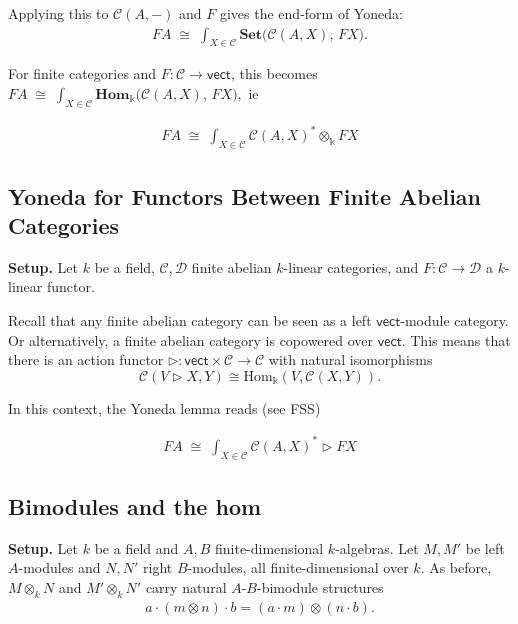 \documentclass[11pt]{article}
\newcommand{\C}{\mathcal{C}}
\theoremstyle{definition}
\begin{document}
Applying this to $\mathcal{C}(A,-)$ and $F$ gives the end-form of Yoneda:
\begin{align}
FA \;\cong\; \int_{X \in \mathcal{C}} \mathbf{Set}\big(\mathcal{C}(A,X),\, FX\big).
\end{align}


For finite categories and $F: \C \to \mathsf{vect}$, this becomes $FA \;\cong\; \int_{X \in \mathcal{C}} \mathbf{Hom}_\Bbbk \big(\mathcal{C}(A,X),\, FX\big), $ ie

\begin{align}
\boxed{
FA \;\cong\; \int_{X \in \mathcal{C}} \mathcal{C}(A,X)^* \otimes_\Bbbk FX
}
\end{align}





\subsection{Yoneda for Functors Between Finite Abelian Categories}

\textbf{Setup.} Let $k$ be a field, $\mathcal{C},\mathcal{D}$ finite abelian $k$-linear
categories, and $F : \mathcal{C} \to \mathcal{D}$ a $k$-linear functor.



Recall that any finite abelian category can be seen as a left $\mathsf{vect}$-module category. Or alternatively, a finite abelian category is copowered over $\mathsf{vect}$. This means that there is an action functor $\triangleright : \mathsf{vect} \times \C \to \C$ with natural isomorphisms $$ \C (V \triangleright X, Y) \cong   \mathrm{Hom}_\Bbbk (V, \C(X,Y)).$$ 


In this context, the Yoneda lemma reads (see FSS)


\begin{align}
\boxed{
FA \;\cong\; \int_{X \in \mathcal{C}} \mathcal{C}(A,X)^* \triangleright FX
}
\end{align}





\subsection{Bimodules and the hom}



\textbf{Setup.} Let $k$ be a field and $A,B$ finite-dimensional $k$-algebras. Let
$M,M'$ be left $A$-modules and $N,N'$ right $B$-modules, all finite-dimensional over $k$.
As before, $M\otimes_k N$ and $M'\otimes_k N'$ carry natural $A$-$B$-bimodule structures
\begin{align}
a\cdot(m\otimes n)\cdot b = (a\cdot m)\otimes(n\cdot b).
\end{align}
\end{document}
